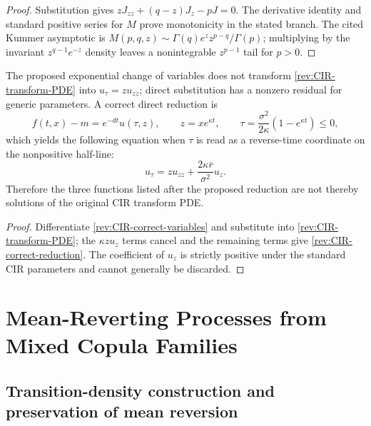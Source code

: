 \begin{proof}
Substitution gives
$zJ_{zz}+(q-z)J_z-pJ=0$.  The derivative identity and standard positive series
for $M$ prove monotonicity in the stated branch.  The cited Kummer asymptotic is
$M(p,q,z)\sim\Gamma(q)e^zz^{p-q}/\Gamma(p)$; multiplying by the invariant
$z^{q-1}e^{-z}$ density leaves a nonintegrable $z^{p-1}$ tail for $p>0$.
\end{proof}

\begin{proposition}
\label{rev:prop-CIR-false-transform}
The proposed exponential change of variables does
not transform \eqref{rev:CIR-transform-PDE} into $u_\tau=zu_{zz}$; direct
substitution has a nonzero residual for generic parameters.  A correct direct
reduction is
\begin{equation}
f(t,x)-m=e^{-dt}u(\tau,z),\qquad
z=xe^{\kappa t},\qquad
\tau=\frac{\sigma^2}{2\kappa}(1-e^{\kappa t})\le0,
\label{rev:CIR-correct-variables}
\end{equation}
which yields the following equation when $\tau$ is read as a reverse-time
coordinate on the nonpositive half-line:
\begin{equation}
u_\tau=zu_{zz}+\frac{2\kappa\bar r}{\sigma^2}u_z.
\label{rev:CIR-correct-reduction}
\end{equation}
Therefore the three functions listed after the proposed reduction are not thereby
solutions of the original CIR transform PDE.
\end{proposition}

\begin{proof}
Differentiate \eqref{rev:CIR-correct-variables} and substitute into
\eqref{rev:CIR-transform-PDE}; the $\kappa z u_z$ terms cancel and the remaining
terms give \eqref{rev:CIR-correct-reduction}.  The coefficient of $u_z$ is
strictly positive under the standard CIR parameters and cannot generally be
discarded.
\end{proof}

\section{Mean-Reverting Processes from Mixed Copula Families}

\subsection{Transition-density construction and preservation of mean reversion}

